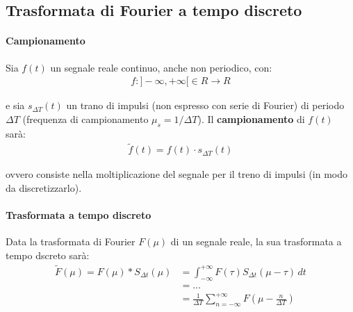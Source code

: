 \documentclass[a4paper, 10pt]{report}
\begin{document}
\subsection*{Trasformata di Fourier a tempo discreto}

\paragraph*{Campionamento} Sia $f(t)$ un segnale reale continuo, anche non periodico, con:
\begin{align*}
f: ]-\infty, +\infty[ \in R \rightarrow R
\end{align*}

\noindent e sia $s_{\Delta T}(t)$ un trano di impulsi (non espresso con serie di Fourier) di periodo $\Delta T$ (frequenza di campionamento $\mu_s = 1 / \Delta T$). Il \textbf{campionamento} di $f(t)$ sarà:
\begin{align*}
\tilde{f}(t) = f(t) \cdot s_{\Delta T}(t)
\end{align*}

\noindent ovvero consiste nella moltiplicazione del segnale per il treno di impulsi (in modo da discretizzarlo).

\paragraph*{Trasformata a tempo discreto} Data la trasformata di Fourier $F(\mu)$ di un segnale reale, la sua trasformata a tempo dscreto sarà:
\begin{align*}
\tilde{F}(\mu) = F(\mu) * S_{\Delta t}(\mu) &= \int^{+\infty}_{-\infty}F(\tau) S_{\Delta t}(\mu - \tau) \, dt \\
&= ...\\
&= \frac{1}{\Delta T} \sum^{+\infty}_{n = -\infty} F \left(\mu - \frac{n}{\Delta T}\right)
\end{align*}

\noindent{}
\end{document}
